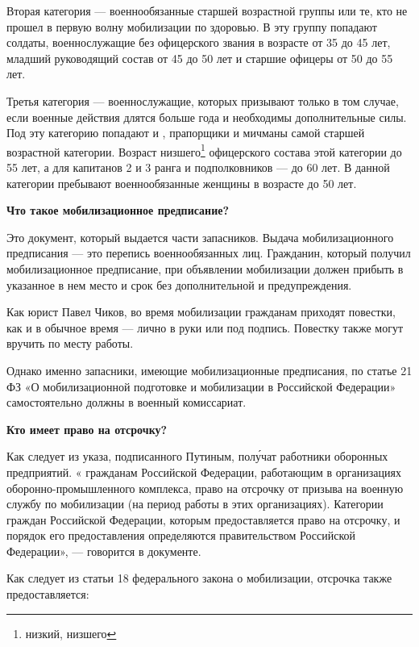 Вторая категория — военнообязанные старшей возрастной группы или те, кто не прошел в первую волну мобилизации по здоровью. В эту группу попадают солдаты, военнослужащие без офицерского звания в возрасте от 35 до 45 лет, младший руководящий состав от 45 до 50 лет и старшие офицеры от 50 до 55 лет.

Третья категория — военнослужащие, которых призывают только в том случае, если военные действия длятся больше года и необходимы дополнительные силы. Под эту категорию попадают  и , прапорщики и мичманы самой старшей возрастной категории. Возраст низшего\footnote{низкий, низшего} офицерского состава этой категории до 55 лет, а для капитанов 2 и 3 ранга и подполковников — до 60 лет. В данной категории пребывают военнообязанные женщины в возрасте до 50 лет.

\textbf{Что такое мобилизационное предписание? }

Это документ, который выдается части запасников. Выдача мобилизационного предписания — это  перепись военнообязанных лиц. Гражданин, который получил мобилизационное предписание, при объявлении мобилизации должен прибыть в указанное в нем место и срок без дополнительной  и предупреждения.

Как  юрист Павел Чиков, во время мобилизации гражданам приходят повестки, как и в обычное время — лично в руки или под подпись. Повестку также могут вручить по месту работы.

Однако именно запасники, имеющие мобилизационные предписания, по статье 21 ФЗ «О мобилизационной подготовке и мобилизации в Российской Федерации» самостоятельно должны  в военный комиссариат.

\textbf{Кто имеет право на отсрочку?}

Как следует из указа, подписанного Путиным,  пол\'{у}чат работники оборонных предприятий. « гражданам Российской Федерации, работающим в организациях оборонно-промышленного комплекса, право на отсрочку от призыва на военную службу по мобилизации (на период работы в этих организациях). Категории граждан Российской Федерации, которым предоставляется право на отсрочку, и порядок его предоставления определяются правительством Российской Федерации», — говорится в документе.

Как следует из статьи 18 федерального закона о мобилизации, отсрочка также предоставляется:

